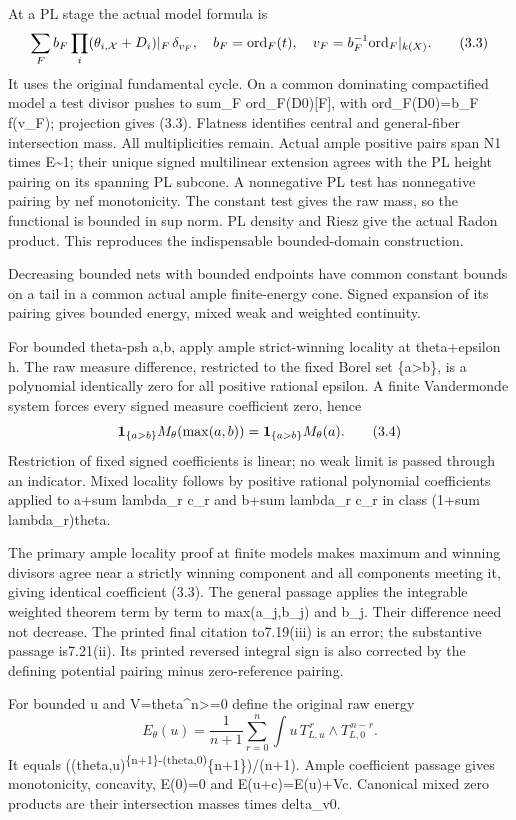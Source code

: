 \documentclass[
  10pt,
]{article}
\begin{document}
At a PL stage the actual model formula is \[
 \sum_F b_F\prod_i(\theta_{i,\mathcal X}+D_i)|_F\,\delta_{v_F},
 \quad b_F={\rm ord}_F(t),\quad v_F=b_F^{-1}{\rm ord}_F|_{k(X)}.            \tag{3.3}
\] It uses the original fundamental cycle. On a common dominating
compactified model a test divisor pushes to sum\_F ord\_F(D0){[}F{]},
with ord\_F(D0)=b\_F f(v\_F); projection gives (3.3). Flatness
identifies central and general-fiber intersection mass. All
multiplicities remain. Actual ample positive pairs span N1 times
E\textasciitilde1; their unique signed multilinear extension agrees with
the PL height pairing on its spanning PL subcone. A nonnegative PL test
has nonnegative pairing by nef monotonicity. The constant test gives the
raw mass, so the functional is bounded in sup norm. PL density and Riesz
give the actual Radon product. This reproduces the indispensable
bounded-domain construction.

Decreasing bounded nets with bounded endpoints have common constant
bounds on a tail in a common actual ample finite-energy cone. Signed
expansion of its pairing gives bounded energy, mixed weak and weighted
continuity.

For bounded theta-psh a,b, apply ample strict-winning locality at
theta+epsilon h. The raw measure difference, restricted to the fixed
Borel set \{a\textgreater b\}, is a polynomial identically zero for all
positive rational epsilon. A finite Vandermonde system forces every
signed measure coefficient zero, hence \[
 {\bf1}_{\{a>b\}}M_\theta(\max(a,b))={\bf1}_{\{a>b\}}M_\theta(a).          \tag{3.4}
\] Restriction of fixed signed coefficients is linear; no weak limit is
passed through an indicator. Mixed locality follows by positive rational
polynomial coefficients applied to a+sum lambda\_r c\_r and b+sum
lambda\_r c\_r in class (1+sum lambda\_r)theta.

The primary ample locality proof at finite models makes maximum and
winning divisors agree near a strictly winning component and all
components meeting it, giving identical coefficient (3.3). The general
passage applies the integrable weighted theorem term by term to
max(a\_j,b\_j) and b\_j. Their difference need not decrease. The printed
final citation to7.19(iii) is an error; the substantive passage
is7.21(ii). Its printed reversed integral sign is also corrected by the
defining potential pairing minus zero-reference pairing.

For bounded u and V=theta\^{}n\textgreater=0 define the original raw
energy \[
 E_\theta(u)=\frac1{n+1}\sum_{r=0}^n\int u\,T_{L,u}^{\,r}\wedge T_{L,0}^{\,n-r}.               \tag{3.5}
\] It equals
((theta,u)\textsuperscript{\{n+1\}-(theta,0)}\{n+1\})/(n+1). Ample
coefficient passage gives monotonicity, concavity, E(0)=0 and
E(u+c)=E(u)+Vc. Canonical mixed zero products are their intersection
masses times delta\_v0.
\end{document}
